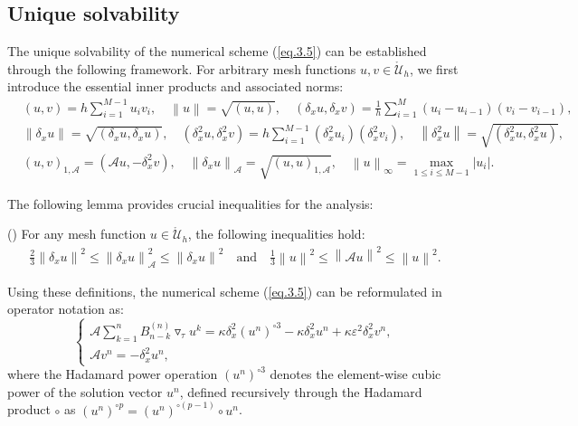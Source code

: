 \documentclass{siamart171218}
\theoremstyle{remark}
\theoremstyle{example}
\numberwithin{equation}{section}
\begin{document}
\subsection{Unique solvability}\label{sec:unique-solvability}
The unique solvability of the numerical scheme (\ref{eq.3.5}) can be established through the following framework. For arbitrary mesh functions $u,v \in \mathring{\mathcal{U}}_h$, we first introduce the essential inner products and associated norms:
\begin{align*}
&(u,v)=h\sum\limits_{i=1}^{M-1}u_{i}v_{i},\quad \left\|u\right\|=\sqrt{(u,u)}, \quad
\left(\delta_xu,\delta_xv\right)=\frac{1}{h}
\sum\limits_{i=1}^{M}(u_i-u_{i-1})(v_i-v_{i-1}), \\ &\left\|\delta_xu\right\|=\sqrt{(\delta_xu,\delta_xu)},\quad
\left(\delta_x^2u,\delta_x^2v\right)=
h\sum\limits_{i=1}^{M-1}\left(\delta_x^2u_{i}\right)\left(\delta_x^2v_{i}\right), \quad\left\|\delta_x^2u\right\|=\sqrt{\left(\delta_x^2u,\delta_x^2u\right)},\\
&\left(u,v\right)_{1,\mathcal{A}}=\left(\mathscr{A}u,-\delta_x^2v\right),\quad
\left\|\delta_xu\right\|_\mathcal{A}=\sqrt{\left(u,u\right)_{1,\mathcal{A}}},\quad
\left\|u\right\|_\infty=\max\limits_{1\leq i \leq M-1}\left|u_{i}\right|.
\end{align*}

The following lemma provides crucial inequalities for the analysis:

\begin{lemma}\label{Le.4.1}(\cite{Sun2012})
For any mesh function $u\in \mathring{\mathcal{U}}_h$, the following inequalities hold:
\begin{align*}
\frac{2}{3}\left\|\delta_x u\right\|^2 \leq \left\|\delta_x u\right\|_\mathcal{A}^2 \leq \left\|\delta_x u\right\|^2 \quad \text{and} \quad \frac{1}{3}\left\|u\right\|^2 \leq \left\|\mathscr{A}u\right\|^2 \leq \left\|u\right\|^2.
\end{align*}
\end{lemma}

Using these definitions, the numerical scheme (\ref{eq.3.5}) can be reformulated in operator notation as:
\begin{equation*}
\begin{cases}\displaystyle
\mathscr{A}\sum\limits_{k=1}^{n}B_{n-k}^{(n)}\triangledown_\tau u^k = \kappa\delta_x^2\left(u^{n}\right)^{\circ 3} - \kappa\delta_x^2 u^{n} + \kappa\varepsilon^2\delta_x^2 v^n, \\
\mathscr{A}v^n = -\delta_x^2 u^n,
\end{cases}
\end{equation*}
where the Hadamard power operation $(u^{n})^{\circ 3}$ denotes the element-wise cubic power of the solution vector $u^{n}$, defined recursively through the Hadamard product $\circ$ as $(u^{n})^{\circ p} = (u^{n})^{\circ (p-1)} \circ u^{n}$.
\end{document}
